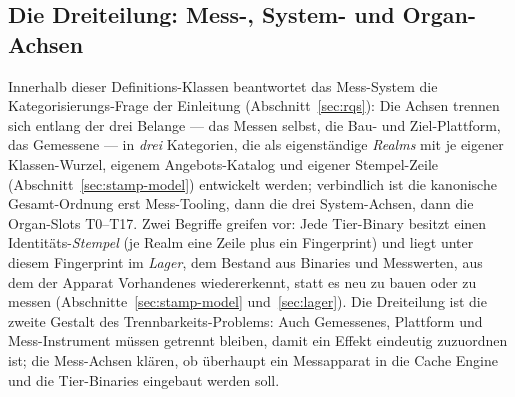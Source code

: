 \begin{nurkurz}
\subsection{Die Dreiteilung: Mess-, System- und Organ-Achsen}\label{sec:axis-triad}
Innerhalb dieser Definitions-Klassen beantwortet das Mess-System die Kategorisierungs-Frage der Einleitung
(Abschnitt~\ref{sec:rqs}): Die Achsen trennen sich entlang der drei Belange --- das Messen selbst, die Bau- und
Ziel-Plattform, das Gemessene --- in \emph{drei} Kategorien, die als eigenständige \emph{Realms} mit je eigener
Klassen-Wurzel, eigenem Angebots-Katalog und eigener Stempel-Zeile (Abschnitt~\ref{sec:stamp-model}) entwickelt
werden; verbindlich ist die kanonische Gesamt-Ordnung erst Mess-Tooling, dann die drei System-Achsen, dann die
Organ-Slots T0--T17. Zwei Begriffe greifen vor: Jede Tier-Binary besitzt einen Identitäts-\emph{Stempel} (je
Realm eine Zeile plus ein Fingerprint) und liegt unter diesem Fingerprint im \emph{Lager}, dem Bestand aus
Binaries und Messwerten, aus dem der Apparat Vorhandenes wiedererkennt, statt es neu zu bauen oder zu messen
(Abschnitte~\ref{sec:stamp-model} und~\ref{sec:lager}). Die Dreiteilung ist die zweite Gestalt des
Trennbarkeits-Problems: Auch Gemessenes, Plattform und Mess-Instrument müssen getrennt bleiben, damit ein Effekt
eindeutig zuzuordnen ist; die Mess-Achsen klären, ob überhaupt ein Messapparat in die Cache Engine und die
Tier-Binaries eingebaut werden soll.
\end{nurkurz}

